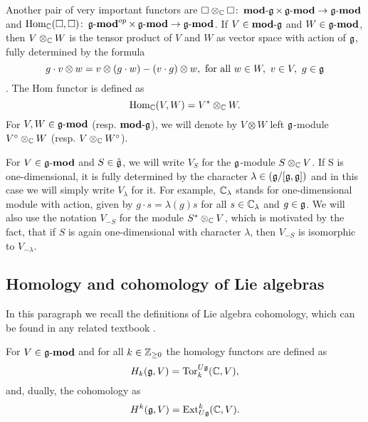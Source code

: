 Another pair of very important functors are $\square \otimes_{\mathbb{C}} \square \colon \operatorname{\mathbf{mod-\mathfrak{g}}} \times
\operatorname{\mathbf{\mathfrak{g}-mod}} \to \operatorname{\mathbf{\mathfrak{g}-mod}}$ and $\operatorname{Hom}_{\mathbb{C}}(\square, \square)\colon \operatorname{\mathbf{\mathfrak{g}-mod}}^{op} \times
\operatorname{\mathbf{\mathfrak{g}-mod}} \to \operatorname{\mathbf{\mathfrak{g}-mod}}$. If $V \in \operatorname{\mathbf{mod-\mathfrak{g}}}$ and $W \in \operatorname{\mathbf{\mathfrak{g}-mod}}$, then $V \otimes_{\mathbb{C}} W$
is the tensor product of $V$ and $W$ as vector space with action of $\mathfrak{g}$, fully determined by the
formula
\[
    g\cdot v\otimes w = v\otimes (g\cdot w) - (v\cdot g) \otimes w, \text{ for all } w\in W,~v\in
    V,~ g\in \mathfrak{g} 
\].
The Hom functor is defined as 
\[
    \operatorname{Hom}_{\mathbb{C}}(V, W)=V^* \otimes_{\mathbb{C}} W.
\]
For $V, W \in \operatorname{\mathbf{\mathfrak{g}-mod}}$ (resp. $\operatorname{\mathbf{mod-\mathfrak{g}}}$), we will denote by $V\otimes W$ left $\mathfrak{g}$-module
$V^\circ \otimes_{\mathbb{C}} W$ (resp. $V \otimes_{\mathbb{C}} W^\circ$).

For $V\in \operatorname{\mathbf{\mathfrak{g}-mod}}$ and $S \in \hat{\mathfrak{g}}$, we will write $V_{S}$ for the $\mathfrak{g}$-module $S\otimes_{\mathbb{C}} V$. 
If S is one-dimensional, it is fully determined by the character $\lambda \in (\mathfrak{g}/[\mathfrak{g},
\mathfrak{g}])$ and in this case we will simply write $V_\lambda$ for it. For example, $\mathbb{C}_\lambda$
stands for one-dimensional module with action, given by $g\cdot s = \lambda(g)s$ for all $s\in
\mathbb{C}_\lambda$ and $g \in \mathfrak{g}$. We will also use the notation $V_{-S}$ for the module $S^*
\otimes_{\mathbb{C}} V$, which is motivated by the fact, that if $S$ is again one-dimensional with character
$\lambda$, then $V_{-S}$ is isomorphic to $V_{-\lambda}$. 

\subsection{Homology and cohomology of Lie algebras}
In this paragraph we recall the definitions of Lie algebra cohomology, which can be found in any
related textbook .


\begin{definition}
    For $V\in \operatorname{\mathbf{\mathfrak{g}-mod}}$ and for all $k\in \mathbb{Z}_{\geq0}$ the homology functors are defined as 
    \begin{equation}
        H_k(\mathfrak{g}, V) = \mathrm{Tor}_k^{U\mathfrak{g}}(\mathbb{C}, V),
    \end{equation}
    and, dually, the cohomology as
    \begin{equation}
        H^k(\mathfrak{g}, V) = \operatorname{Ext}^k_{U\mathfrak{g}}(\mathbb{C}, V).
    \end{equation}
\end{definition}

